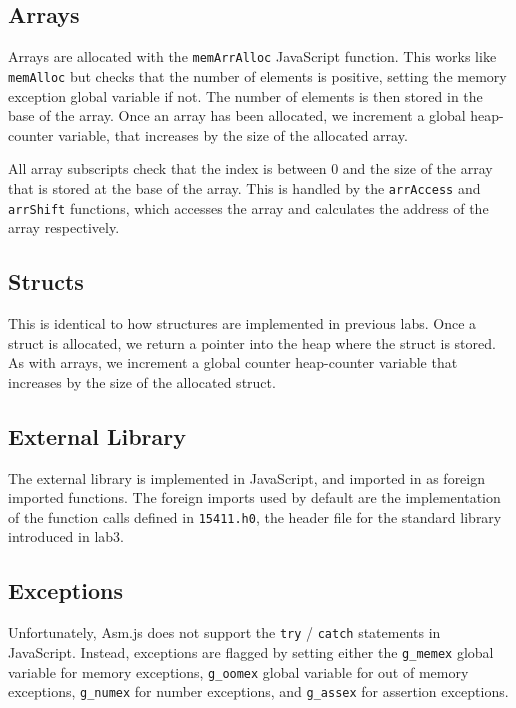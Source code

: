 \documentclass[twoside]{article}
\begin{document}
\begin{multicols}{2}
  \subsection{Arrays}
    Arrays are allocated with the \texttt{memArrAlloc} JavaScript function. This
    works like \texttt{memAlloc} but checks that the number of elements is
    positive, setting the memory exception global variable if not. The number of elements
    is then stored in the base of the array. Once an array has been allocated, we increment
    a global heap-counter variable, that increases by the size of the allocated array.

    All array subscripts check that the index is between 0 and the size of the
    array that is stored at the base of the array. This is handled by the
    \texttt{arrAccess} and \texttt{arrShift} functions, which accesses the array
    and calculates the address of the array respectively.

  \subsection{Structs}
    This is identical to how structures are implemented in previous labs. Once a struct
    is allocated, we return a pointer into the heap where the struct is stored. As with
    arrays, we increment a global counter heap-counter variable that increases by the 
    size of the allocated struct. 

  \subsection{External Library}
    The external library is implemented in JavaScript, and imported in as foreign
    imported functions. The foreign imports used by default are the implementation 
    of the function calls defined in \texttt{15411.h0}, the header file for the 
    standard library introduced in lab3. 

  \subsection{Exceptions}
    Unfortunately, Asm.js does not support the \texttt{try} / \texttt{catch}
    statements in JavaScript.
    Instead, exceptions are flagged by setting either the \texttt{g\_memex} global variable
    for memory exceptions, \texttt{g\_oomex} global variable for out of memory
    exceptions, \texttt{g\_numex} for number exceptions, and \texttt{g\_assex} for
    assertion exceptions.


\end{multicols}
\end{document}
